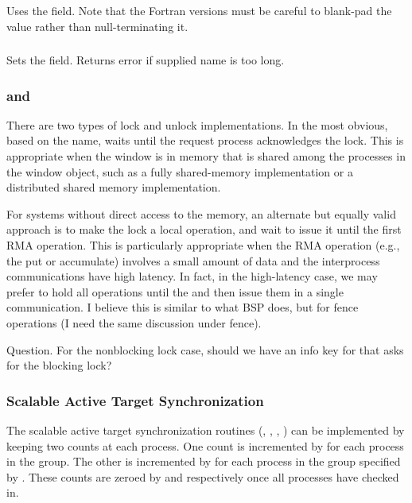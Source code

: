 \documentclass{article}
\begin{document}
\subsubsection{}
Uses the  field.  Note that the Fortran versions must be careful to
blank-pad the value rather than null-terminating it.

\subsubsection{}
Sets the  field.  Returns error if supplied name is too long.

\subsubsection{ and }
There are two types of lock and unlock implementations.  In the most
obvious, based on the name,  waits until the
request process acknowledges the lock. This is appropriate when the
window is in memory that is shared among the processes in the window
object, such as a fully shared-memory implementation or a distributed
shared memory implementation.

For systems without direct access to the memory, an alternate but
equally valid approach is to make the lock a local operation, and wait
to issue it until the first RMA operation.  This is particularly
appropriate when the RMA operation (e.g., the put or accumulate)
involves a small amount of data and the interprocess communications
have high latency.  In fact, in the high-latency case, we may prefer
to hold all operations until the  and then issue
them in a single communication.  I believe this is similar to what BSP
does, but for fence operations (I need the same discussion under fence).

Question.  For the nonblocking lock case, should we have an info key
for  that asks for the blocking lock?  

\begin{tcp}
\end{tcp}
\begin{shmem}
\end{shmem}
\begin{via}
\end{via}

\subsubsection{Scalable Active Target Synchronization}
The scalable active target synchronization routines (,
, , )
can be implemented by keeping two counts at each process.  One count is
incremented by  for each process in the group.  
The other is incremented by  for each process in the
group specified by .  These counts are zeroed by
 and  respectively once all
processes have checked in.
\end{document}
